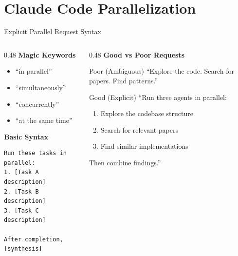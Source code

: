 \documentclass[aspectratio=169,11pt]{beamer}
\begin{document}
\section{Claude Code Parallelization}

\begin{frame}{Explicit Parallel Request Syntax}
    \begin{columns}[T]
        \begin{column}{0.48\textwidth}
            \textbf{Magic Keywords}
            \begin{itemize}
                \item ``in parallel''
                \item ``simultaneously''
                \item ``concurrently''
                \item ``at the same time''
            \end{itemize}

            \vspace{0.3cm}
            \textbf{Basic Syntax}
            \begin{lstlisting}[style=prompt]
Run these tasks in parallel:
1. [Task A description]
2. [Task B description]
3. [Task C description]

After completion, [synthesis]
            \end{lstlisting}
        \end{column}
        \begin{column}{0.48\textwidth}
            \textbf{Good vs Poor Requests}

            \begin{alertblock}{Poor (Ambiguous)}
                \footnotesize
                ``Explore the code. Search for papers. Find patterns.''
            \end{alertblock}

            \begin{exampleblock}{Good (Explicit)}
                \footnotesize
                ``Run three agents in parallel:
                \begin{enumerate}
                    \item Explore the codebase structure
                    \item Search for relevant papers
                    \item Find similar implementations
                \end{enumerate}
                Then combine findings.''
            \end{exampleblock}
        \end{column}
    \end{columns}
\end{frame}
\end{document}
